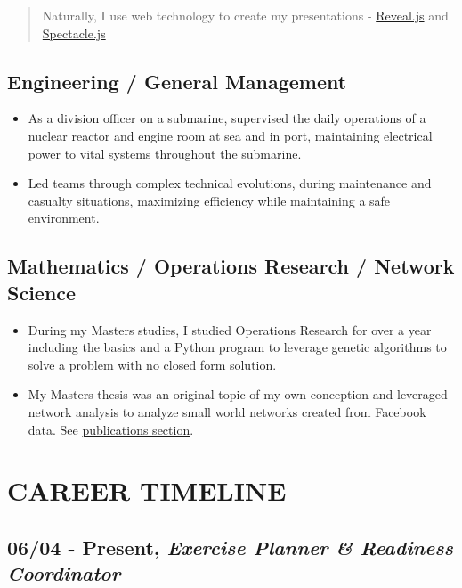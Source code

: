 \documentclass[10pt]{article}
\def\tightlist{}
\begin{document}
\begin{quote}
Naturally, I use web technology to create my presentations -
\href{https://revealjs.com/\#/}{Reveal.js} and
\href{https://formidable.com/open-source/spectacle/}{Spectacle.js}
\end{quote}

\subsection{Engineering / General
Management}\label{engineering-general-management}

\begin{itemize}
\tightlist
\item
  As a division officer on a submarine, supervised the daily operations
  of a nuclear reactor and engine room at sea and in port, maintaining
  electrical power to vital systems throughout the submarine.
\item
  Led teams through complex technical evolutions, during maintenance and
  casualty situations, maximizing efficiency while maintaining a safe
  environment.
\end{itemize}

\subsection{Mathematics / Operations Research / Network
Science}\label{mathematics-operations-research-network-science}

\begin{itemize}
\tightlist
\item
  During my Masters studies, I studied Operations Research for over a
  year including the basics and a Python program to leverage genetic
  algorithms to solve a problem with no closed form solution.
\item
  My Masters thesis was an original topic of my own conception and
  leveraged network analysis to analyze small world networks created
  from Facebook data. See
  \protect\hyperlink{publications-citations}{publications section}.
\end{itemize}

\section{CAREER TIMELINE}\label{career-timeline}

\subsection{\texorpdfstring{06/04 - Present, \textbf{\emph{Exercise
Planner \& Readiness
Coordinator}}}{06/04 - Present, Exercise Planner \& Readiness Coordinator}}\label{present-exercise-planner-readiness-coordinator}
\end{document}
